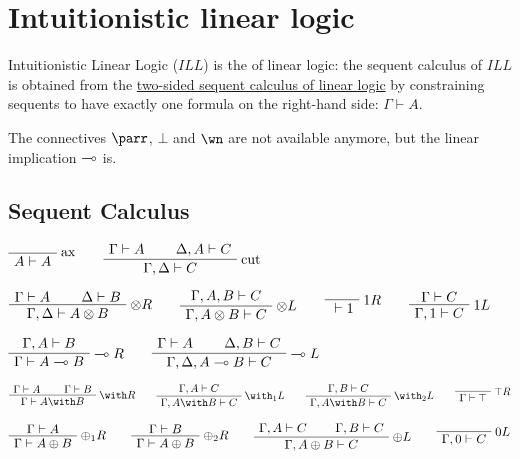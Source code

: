 \chapter{Intuitionistic linear logic}\label{intuitionistic-linear-logic}

Intuitionistic Linear Logic (\(ILL\)) is the
 of
linear logic: the sequent calculus of \(ILL\) is obtained from the
\hyperref[sequents-and-proofs]{two-sided sequent calculus
of linear logic} by constraining sequents to have exactly one formula on
the right-hand side: \(\Gamma\vdash A\).

The connectives \(\parr\), \(\bot\) and \(\wn\) are not available
anymore, but the linear implication \(\multimap\) is.

\section{Sequent Calculus}

\(\LabelRule{\rulename{ax}}
\NulRule{A\vdash A}
\DisplayProof
\qquad
\AxRule{\Gamma\vdash A}
\AxRule{\Delta,A\vdash C}
\LabelRule{\rulename{cut}}
\BinRule{\Gamma,\Delta\vdash C}
\DisplayProof\)

\(\AxRule{\Gamma\vdash A}
\AxRule{\Delta\vdash B}
\LabelRule{\tens R}
\BinRule{\Gamma,\Delta\vdash A\tens B}
\DisplayProof
\qquad
\AxRule{\Gamma,A,B\vdash C}
\LabelRule{\tens L}
\UnaRule{\Gamma,A\tens B\vdash C}
\DisplayProof
\qquad
\LabelRule{\one R}
\NulRule{{}\vdash\one}
\DisplayProof
\qquad
\AxRule{\Gamma\vdash C}
\LabelRule{\one L}
\UnaRule{\Gamma,\one\vdash C}
\DisplayProof\)

\(\AxRule{\Gamma,A\vdash B}
\LabelRule{\limp R}
\UnaRule{\Gamma\vdash A\limp B}
\DisplayProof
\qquad
\AxRule{\Gamma\vdash A}
\AxRule{\Delta,B\vdash C}
\LabelRule{\limp L}
\BinRule{\Gamma,\Delta,A\limp B\vdash C}
\DisplayProof\)

\(\AxRule{\Gamma\vdash A}
\AxRule{\Gamma\vdash B}
\LabelRule{\with R}
\BinRule{\Gamma\vdash A\with B}
\DisplayProof
\qquad
\AxRule{\Gamma,A\vdash C}
\LabelRule{\with_1 L}
\UnaRule{\Gamma,A\with B\vdash C}
\DisplayProof
\qquad
\AxRule{\Gamma,B\vdash C}
\LabelRule{\with_2 L}
\UnaRule{\Gamma,A\with B\vdash C}
\DisplayProof
\qquad
\LabelRule{\top R}
\NulRule{\Gamma\vdash\top}
\DisplayProof\)

\(\AxRule{\Gamma\vdash A}
\LabelRule{\plus_1 R}
\UnaRule{\Gamma\vdash A\plus B}
\DisplayProof
\qquad
\AxRule{\Gamma\vdash B}
\LabelRule{\plus_2 R}
\UnaRule{\Gamma\vdash A\plus B}
\DisplayProof
\qquad
\AxRule{\Gamma,A\vdash C}
\AxRule{\Gamma,B\vdash C}
\LabelRule{\plus L}
\BinRule{\Gamma,A\plus B\vdash C}
\DisplayProof
\qquad
\LabelRule{\zero L}
\NulRule{\Gamma,\zero\vdash C}
\DisplayProof\)

